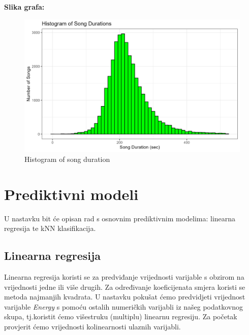     \textbf{Slika grafa:}
    \begin{figure}[H]
        \includegraphics[scale=0.9]{slike/Histogram of song durations.png}
        \centering
        \caption{Histogram of song duration}
        
    \end{figure}

\clearpage
\section{Prediktivni modeli}

	U nastavku bit će opisan rad s osnovnim prediktivnim modelima: linearna regresija te kNN klasifikacija. 
	
	\subsection{Linearna regresija}
	
	Linearna regresija koristi se za predviđanje vrijednosti varijable s obzirom na vrijednosti jedne ili više drugih. Za određivanje koeficijenata smjera koristi se metoda najmanjih kvadrata. U nastavku pokušat ćemo predvidjeti vrijednost varijable \textit{Energy} s pomoću ostalih numeričkih varijabli iz našeg podatkovnog skupa, tj.koristit ćemo višestruku (multiplu) linearnu regresiju.
	Za početak provjerit ćemo vrijednosti kolinearnosti ulaznih varijabli.
	
